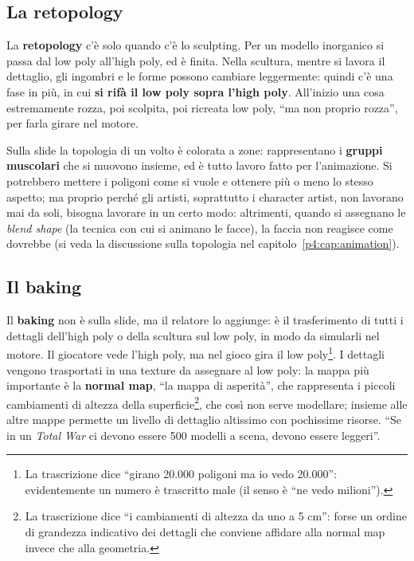 \subsection{La retopology}

La \textbf{retopology} c'è solo quando c'è lo sculpting. Per un modello
inorganico si passa dal low poly all'high poly, ed è finita. Nella scultura,
mentre si lavora il dettaglio, gli ingombri e le forme possono cambiare
leggermente: quindi c'è una fase in più, in cui \textbf{si rifà il low poly
sopra l'high poly}. All'inizio una cosa estremamente rozza, poi scolpita, poi
ricreata low poly, ``ma non proprio rozza'', per farla girare nel motore.

Sulla slide la topologia di un volto è colorata a zone: rappresentano i
\textbf{gruppi muscolari} che si muovono insieme, ed è tutto lavoro fatto per
l'animazione. Si potrebbero mettere i poligoni come si vuole e ottenere più o
meno lo stesso aspetto; ma proprio perché gli artisti, soprattutto i character
artist, non lavorano mai da soli, bisogna lavorare in un certo modo: altrimenti,
quando si assegnano le \emph{blend shape} (la tecnica con cui si animano le
facce), la faccia non reagisce come dovrebbe (si veda la discussione sulla
topologia nel capitolo~\ref{p4:cap:animation}).

\subsection{Il baking}

Il \textbf{baking} non è sulla slide, ma il relatore lo aggiunge: è il
trasferimento di tutti i dettagli dell'high poly o della scultura sul low poly,
in modo da simularli nel motore. Il giocatore vede l'high poly, ma nel gioco
gira il low poly\footnote{La trascrizione dice ``girano 20.000 poligoni ma io
vedo 20.000'': evidentemente un numero è trascritto male (il senso è ``ne
vedo milioni'').}. I dettagli vengono trasportati in una texture da assegnare al
low poly: la mappa più importante è la \textbf{normal map}, ``la mappa di
asperità'', che rappresenta i piccoli cambiamenti di altezza della
superficie\footnote{La trascrizione dice ``i cambiamenti di altezza da uno a 5
cm'': forse un ordine di grandezza indicativo dei dettagli che conviene
affidare alla normal map invece che alla geometria.}, che così non serve
modellare; insieme alle altre mappe permette un livello di dettaglio
altissimo con pochissime risorse. ``Se in un \emph{Total War} ci devono essere
500 modelli a scena, devono essere leggeri''.

